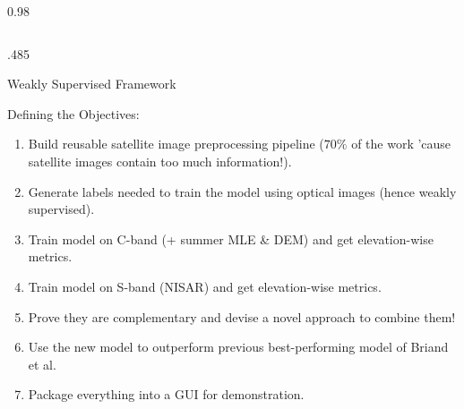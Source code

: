 \documentclass[final,svgnames,english]{beamer}
\begin{document}
\begin{frame}[fragile]{}
\begin{columns}[T]
\begin{column}{0.98\linewidth}
\begin{columns}[T]
\begin{column}{.485\linewidth}
\begin{inriablock}{Weakly Supervised Framework}
\begin{figure}[!htbp]
              \vspace{0.2em}
              \label{fig:concept}
            \end{figure}
          \end{inriablock}

          \begin{inriablock}{Defining the Objectives:}
            \begin{enumerate}
              \item Build reusable satellite image preprocessing pipeline ($70\%$ of the work 'cause satellite images contain too much information!). 
              \item Generate labels needed to train the model using optical images (hence weakly supervised). 
              \item Train model on C-band (+ summer MLE \& DEM) and get elevation-wise metrics. 
              \item Train model on S-band (NISAR) and get elevation-wise metrics.
              \item Prove they are complementary and devise a novel approach to combine them!
              \item Use the new model to outperform previous best-performing model of Briand et al.
              \item Package everything into a GUI for demonstration.
            \end{enumerate}
          \end{inriablock}


\end{column}
\end{columns}
\end{column}
\end{columns}
\end{frame}
\end{document}
